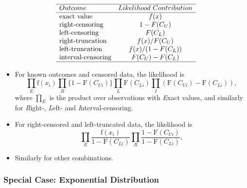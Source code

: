 \documentclass[]{book}
\begin{document}
\[\begin{array}{lc}
\hline Outcome            & Likelihood~Contribution \\\hline
\text{exact value      }  & f(x) \\
\text{right-censoring  }  & 1-F(C_U) \\
\text{left-censoring   }  & F(C_L) \\
\text{right-truncation }  & f(x)/F(C_U) \\
\text{left-truncation    }& f(x)/(1-F(C_L)) \\
\text{interval-censoring} & F(C_U)-F(C_L) \\
\hline
\end{array}\]

\begin{itemize}
\item
  For known outcomes and censored data, the likelihood is
  \[\prod_{E} \mathrm{f}(x_i) \prod_{R} \{1-\mathrm{F}(C_{Ui})\} \prod_{L}
  \mathrm{F}(C_{Li}) \prod_{I} (\mathrm{F}(C_{Ui})-\mathrm{F}(C_{Li})),\]
  where \(\prod_{E}\) is the product over observations with \emph{E}xact
  values, and similarly for \emph{R}ight-, \emph{L}eft- and
  \emph{I}nterval-censoring.
\item
  For right-censored and left-truncated data, the likelihood is
  \[\prod_{E} \frac{\mathrm{f}(x_i)}{1-\mathrm{F}(C_{Li})} \prod_{R} \frac{1-\mathrm{F}(C_{Ui})}{1-\mathrm{F}(C_{Li})} ,\]
\item
  Similarly for other combinations.
\end{itemize}

\subsubsection{Special Case: Exponential
Distribution}\label{special-case-exponential-distribution}
\end{document}
